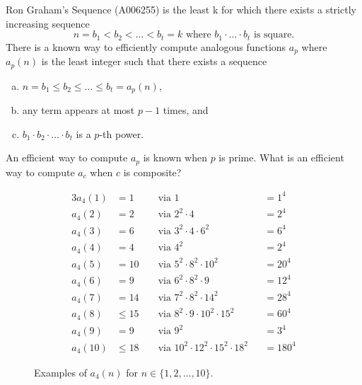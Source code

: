 \documentclass{article}
\begin{document}
  Ron Graham's Sequence (A006255) is the least k for which there exists a
  strictly increasing sequence \[
    n = b_1 < b_2 < \hdots < b_t = k \text{ where }
    b_1 \cdot\hdots\cdot b_t \text{ is square.}
  \]
  There is a known way to efficiently compute analogous functions $a_p$ where
  $a_p(n)$ is the least integer such that there exists a sequence
  \begin{enumerate}[(a)]
    \item $n = b_1 \leq b_2 \leq \hdots \leq b_t = a_p(n)$,
    \item any term appears at most $p - 1$ times, and
    \item $b_1 \cdot b_2 \cdot\hdots\cdot b_t$ is a $p$-th power.
  \end{enumerate}
\begin{question}
  An efficient way to compute $a_p$ is known when $p$ is prime.
  What is an efficient way to compute $a_c$ when $c$ is composite?
\end{question}
\begin{figure}[!h]
  \centering
  \begin{alignat*}{3}
  a_4(1) &= 1      &&\text{ via } 1                                     &&= 1^4\\
  a_4(2) &= 2      &&\text{ via } 2^2 \cdot 4                           &&= 2^4\\
  a_4(3) &= 6      &&\text{ via } 3^2 \cdot 4 \cdot 6^2                 &&= 6^4\\
  a_4(4) &= 4      &&\text{ via } 4^2                                   &&= 2^4\\
  a_4(5) &= 10     &&\text{ via } 5^2 \cdot 8^2 \cdot 10^2              &&= 20^4\\
  a_4(6) &= 9      &&\text{ via } 6^2 \cdot 8^2 \cdot 9                 &&= 12^4\\
  a_4(7) &= 14     &&\text{ via } 7^2 \cdot 8^2 \cdot 14^2              &&= 28^4\\
  a_4(8) &\leq 15  &&\text{ via } 8^2 \cdot 9 \cdot 10^2 \cdot 15^2     &&= 60^4\\
  a_4(9) &= 9      &&\text{ via } 9^2                                   &&= 3^4\\
  a_4(10) &\leq 18 &&\text{ via } 10^2 \cdot 12^2 \cdot 15^2 \cdot 18^2 &&= 180^4
  \end{alignat*}
  \caption{
    Examples of $a_4(n)$ for $n \in \{1, 2,\hdots,10\}$.
  }
\end{figure}
\end{document}
